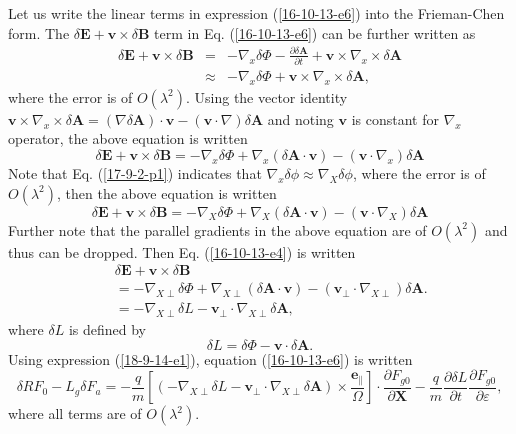 \documentclass{article}
\newcommand{\tmmathbf}[1]{\ensuremath{\boldsymbol{#1}}}
\begin{document}
Let us write the linear terms in expression (\ref{16-10-13-e6}) into the
Frieman-Chen form. The $\delta \mathbf{E}+\mathbf{v} \times \delta \mathbf{B}$
term in Eq. (\ref{16-10-13-e6}) can be further written as
\begin{eqnarray*}
  \delta \mathbf{E}+\mathbf{v} \times \delta \mathbf{B} & = & - \nabla_x
  \delta \Phi - \frac{\partial \delta \mathbf{A}}{\partial t} +\mathbf{v}
  \times \nabla_x \times \delta \mathbf{A}\\
  & \approx & - \nabla_x \delta \Phi +\mathbf{v} \times \nabla_x \times
  \delta \mathbf{A},
\end{eqnarray*}
where the error is of $O (\lambda^2)$. Using the vector identity $\mathbf{v}
\times \nabla_x \times \delta \mathbf{A}= (\nabla \delta \mathbf{A}) \cdot
\mathbf{v}- (\mathbf{v} \cdot \nabla) \delta \mathbf{A}$ and noting
$\mathbf{v}$ is constant for $\nabla_x$ operator, the above equation is
written
\begin{equation}
  \delta \mathbf{E}+\mathbf{v} \times \delta \mathbf{B}= - \nabla_x \delta
  \Phi + \nabla_x (\delta \mathbf{A} \cdot \mathbf{v}) - (\mathbf{v} \cdot
  \nabla_x) \delta \mathbf{A}
\end{equation}
Note that Eq. (\ref{17-9-2-p1}) indicates that $\nabla_x \delta \phi \approx
\nabla_X \delta \phi$, where the error is of $O (\lambda^2)$, then the above
equation is written
\begin{equation}
  \label{16-10-13-e4} \delta \mathbf{E}+\mathbf{v} \times \delta \mathbf{B}= -
  \nabla_X \delta \Phi + \nabla_X (\delta \mathbf{A} \cdot \mathbf{v}) -
  (\mathbf{v} \cdot \nabla_X) \delta \mathbf{A}
\end{equation}
Further note that the parallel gradients in the above equation are of $O
(\lambda^2)$ and thus can be dropped. Then Eq. (\ref{16-10-13-e4}) is written
\begin{eqnarray}
  &  & \delta \mathbf{E}+\mathbf{v} \times \delta \mathbf{B} \nonumber\\
  &  & = - \nabla_{X \perp} \delta \Phi + \nabla_{X \perp} (\delta \mathbf{A}
  \cdot \mathbf{v}) - (\mathbf{v}_{\perp} \cdot \nabla_{X \perp}) \delta
  \mathbf{A}. \nonumber\\
  &  & = - \nabla_{X \perp} \delta L -\mathbf{v}_{\perp} \cdot \nabla_{X
  \perp} \delta \mathbf{A},  \label{18-9-14-e1}
\end{eqnarray}
where $\delta L$ is defined by
\begin{equation}
  \label{19-1-2-p1} \delta L = \delta \Phi -\mathbf{v} \cdot \delta
  \mathbf{A}.
\end{equation}
Using expression (\ref{18-9-14-e1}), equation (\ref{16-10-13-e6}) is written
\begin{equation}
  \label{16-10-20-1} \delta R F_0 - L_g \delta F_a = - \frac{q}{m} \left[ (-
  \nabla_{X \perp} \delta L -\mathbf{v}_{\perp} \cdot \nabla_{X \perp} \delta
  \mathbf{A}) \times \frac{\tmmathbf{e}_{\parallel}}{\Omega} \right] \cdot
  \frac{\partial F_{g 0}}{\partial \mathbf{X}} - \frac{q}{m}  \frac{\partial
  \delta L}{\partial t}  \frac{\partial F_{g 0}}{\partial \varepsilon},
\end{equation}
where all terms are of $O (\lambda^2)$.
\end{document}

